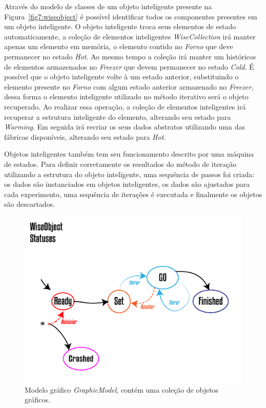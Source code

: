 \documentclass[a4paper,12pt]{monografia}
\theoremstyle{plain}
\theoremstyle{definition}
\theoremstyle{remark}
\begin{document}
Através do modelo de classes de um objeto inteligente presente na Figura~\ref{fig7:wiseobject} é possível identificar todos os componentes presentes em um objeto inteligente. O objeto inteligente troca seus elementos de estado automaticamente, a coleção de elementos inteligentes \textit{WiseCollection} irá manter apenas um elemento em memória, o elemento contido no \textit{Forno} que deve permanecer no estado \textit{Hot}. Ao mesmo tempo a coleção irá manter um históricos de elementos armazenados no \textit{Freezer} que devem permanecer no estado \textit{Cold}. É possível que o objeto inteligente volte à um estado anterior, substituindo o elemento presente no \textit{Forno} com algum estado anterior armazenado no \textit{Freezer}, dessa forma o elemento inteligente utilizado no método iterativo será o objeto recuperado. Ao realizar essa operação, a coleção de elementos inteligentes irá recuperar a estrutura inteligente do elemento, alterando seu estado para \textit{Warming}. Em seguida irá recriar os seus dados abstratos utilizando uma das fábricas disponíveis, alterando seu estado para \textit{Hot}.

Objetos inteligentes também tem seu funcionamento descrito por uma máquina de estados. Para definir corretamente os resultados do método de iteração utilizando a estrutura do objeto inteligente, uma sequência de passos foi criada: os dados são instanciados em objetos inteligentes, os dados são ajustados para cada experimento, uma sequência de iterações é executada e finalmente os objetos são descartados.

\begin{figure}[!htbp]
	\centering
	\includegraphics[scale=1]{Figures/WiseObjectStatus.png}
	\caption{Modelo gráfico \textit{GraphicModel}, contém uma coleção de objetos gráficos.}
	\label{fig7:wiseobjectstatuses}
\end{figure}
\end{document}

